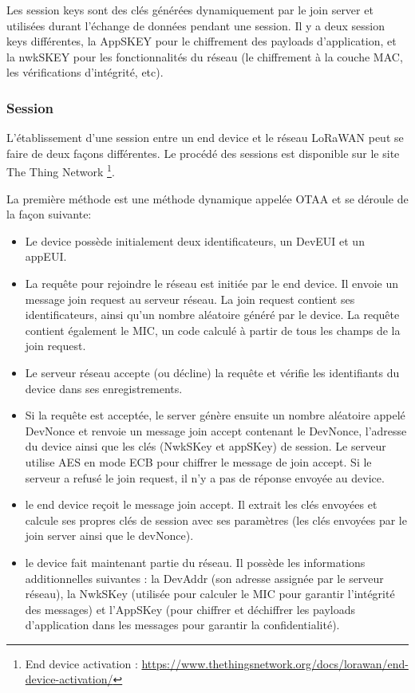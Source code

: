 Les session keys sont des clés générées dynamiquement par le join server et utilisées durant l'échange de données pendant une session. Il y a deux session keys différentes, la AppSKEY pour le chiffrement des payloads d'application, et la nwkSKEY pour les fonctionnalités du réseau (le chiffrement à la couche \ac{MAC}, les vérifications d'intégrité, etc).

\subsubsection{Session}

L'établissement d'une session entre un end device et le réseau LoRaWAN peut se faire de deux façons différentes. Le procédé des sessions est disponible sur le site The Thing Network \footnote{End device activation : \href{https://www.thethingsnetwork.org/docs/lorawan/end-device-activation/}{https://www.thethingsnetwork.org/docs/lorawan/end-device-activation/}}.

La première méthode est une méthode dynamique appelée \ac{OTAA} et se déroule de la façon suivante: 
\begin{itemize}
\item Le device possède initialement deux identificateurs, un DevEUI et un appEUI.
\item La requête pour rejoindre le réseau est initiée par le end device. Il envoie un message join request au serveur réseau. La join request contient ses identificateurs, ainsi qu'un nombre aléatoire généré par le device. La requête contient également le \ac{MIC}, un code calculé à partir de tous les champs de la join request.
\item Le serveur réseau accepte (ou décline) la requête et vérifie les identifiants du device dans ses enregistrements.
\item Si la requête est acceptée, le server génère ensuite un nombre aléatoire appelé DevNonce et renvoie un message join accept contenant le DevNonce, l'adresse du device ainsi que les clés (NwkSKey et appSKey) de session. Le serveur utilise \ac{AES} en mode \ac{ECB} pour chiffrer le message de join accept. Si le serveur a refusé le join request, il n'y a pas de réponse envoyée au device.
\item le end device reçoit le message join accept. Il extrait les clés envoyées et calcule ses propres clés de session avec ses paramètres (les clés envoyées par le join server ainsi que le devNonce).
\item le device fait maintenant partie du réseau. Il possède les informations additionnelles suivantes : la DevAddr (son adresse assignée par le serveur réseau), la NwkSKey (utilisée pour calculer le \ac{MIC} pour garantir l'intégrité des messages) et l'AppSKey (pour chiffrer et déchiffrer les payloads d'application dans les messages pour garantir la confidentialité).
\end{itemize}
        
